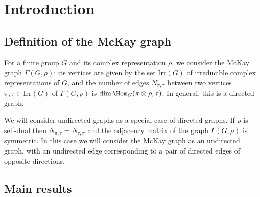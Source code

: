 \section{Introduction}


\subsection{Definition of the McKay graph}
For a finite group $G$ and its complex representation $\rho$, we consider the McKay graph $\Gamma(G, \rho)$: its vertices are given by the set $\mathrm{Irr}(G)$ of irreducible complex representations of $G$, and the number of edges $N_{\pi,\tau}$ between two vertices $\pi,\tau \in \mathrm{Irr}(G)$ of $\Gamma(G,\rho)$ is $\dim \Hom_G (\pi\otimes \rho, \tau) $. In general, this is a directed graph.

We will consider undirected graphs as a special case of directed graphs. If $\rho$ is self-dual then $N_{\pi,\tau}=N_{\tau,\pi}$ and the adjacency matrix of the graph $\Gamma(G,\rho)$ is symmetric. In this case we will consider the McKay graph as an undirected graph, with an undirected edge corresponding to a pair of directed edges of opposite directions.



\subsection{Main results}

